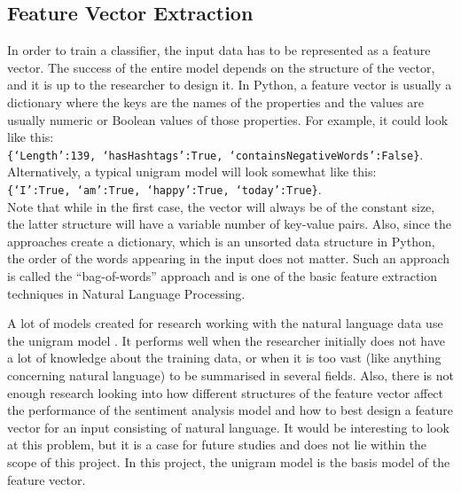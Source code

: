 \subsection{Feature Vector Extraction}
In order to train a classifier, the input data has to be represented as a feature vector. The success of the entire model depends on the structure of the vector, and it is up to the researcher to design it. In Python, a feature vector is usually a dictionary where the keys are the names of the properties and the values are usually numeric or Boolean values of those properties. For example, it could look like this: \\ \texttt{\{`Length':139, `hasHashtags':True, `containsNegativeWords':False\}}. \\Alternatively, a typical unigram model will look somewhat like this:\\ \texttt{\{`I':True, `am':True, `happy':True, `today':True\}}.\\Note that while in the first case, the vector will always be of the constant size, the latter structure will have a variable number of key-value pairs. Also, since the approaches create a dictionary, which is an unsorted data structure in Python, the order of the words appearing in the input does not matter. Such an approach is called the ``bag-of-words'' approach and is one of the basic feature extraction techniques in Natural Language Processing.  

 A lot of models created for research working with the natural language data use the unigram model \cite{agarwal2011sentiment}. It performs well when the researcher initially does not have a lot of knowledge about the training data, or when it is too vast (like anything concerning natural language) to be summarised in several fields. Also, there is not enough research looking into how different structures of the feature vector affect the performance of the sentiment analysis model and how to best design a feature vector for an input consisting of natural language. It would be interesting to look at this problem, but it is a case for future studies and does not lie within the scope of this project. In this project, the unigram model is the basis model of the feature vector.  

